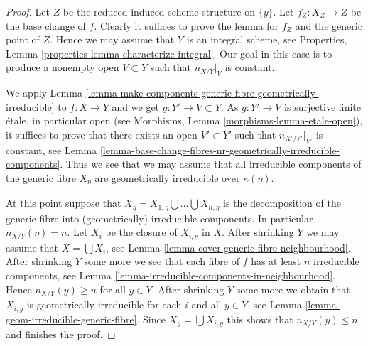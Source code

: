 \documentclass[10pt,a4paper]{amsart}
\theoremstyle{plain}
\theoremstyle{definition}
\theoremstyle{remark}
\numberwithin{equation}{subsection}
\begin{document}
\begin{proof}
Let $Z$ be the reduced induced scheme structure on $\overline{\{y\}}$.
Let $f_Z : X_Z \to Z$ be the base change of $f$. Clearly it suffices to prove
the lemma for $f_Z$ and the generic point of $Z$. Hence we may assume that
$Y$ is an integral scheme, see
Properties, Lemma \ref{properties-lemma-characterize-integral}.
Our goal in this case is to produce a nonempty open $V \subset Y$ such that
$n_{X/Y}|_V$ is constant.

\medskip\noindent
We apply
Lemma \ref{lemma-make-components-generic-fibre-geometrically-irreducible}
to $f : X \to Y$ and we get $g : Y' \to V \subset Y$. As $g : Y' \to V$ is
surjective finite \'etale, in particular open (see
Morphisms, Lemma \ref{morphisms-lemma-etale-open}),
it suffices to prove that there exists an open $V' \subset Y'$
such that $n_{X'/Y'}|_{V'}$ is constant, see
Lemma \ref{lemma-base-change-fibres-nr-geometrically-irreducible-components}.
Thus we see that we may assume that all irreducible components of
the generic fibre $X_\eta$ are geometrically irreducible over $\kappa(\eta)$.

\medskip\noindent
At this point suppose that
$X_\eta = X_{1, \eta} \bigcup \ldots \bigcup X_{n, \eta}$
is the decomposition of the generic fibre into
(geometrically) irreducible components.
In particular $n_{X/Y}(\eta) = n$.
Let $X_i$ be the closure of
$X_{i, \eta}$ in $X$. After shrinking $Y$ we may assume that
$X = \bigcup X_i$, see
Lemma \ref{lemma-cover-generic-fibre-neighbourhood}.
After shrinking $Y$ some more we see that each fibre of
$f$ has at least $n$ irreducible components, see
Lemma \ref{lemma-irreducible-components-in-neighbourhood}.
Hence $n_{X/Y}(y) \geq n$ for all $y \in Y$.
After shrinking $Y$ some more we obtain that $X_{i, y}$
is geometrically irreducible for each $i$ and all $y \in Y$, see
Lemma \ref{lemma-geom-irreducible-generic-fibre}.
Since $X_y = \bigcup X_{i, y}$
this shows that $n_{X/Y}(y) \leq n$ and finishes the proof.
\end{proof}
\end{document}
